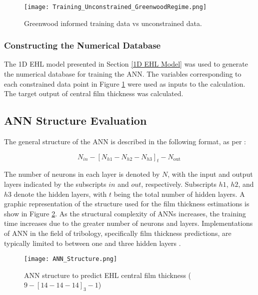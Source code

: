 \begin{figure}
	\centering  
	\texttt{[image: Training\_Unconstrained\_GreenwoodRegime.png]}
	\caption{Greenwood informed training data vs unconstrained data.}
	\label{Training_Unconstrained_GreenwoodRegime}
\end{figure} 

\subsubsection{Constructing the Numerical Database}

The 1D EHL model presented in Section \ref{1D EHL Model} was used to generate the numerical database for training the ANN. The variables corresponding to each constrained data point in Figure \ref{Training_Unconstrained_GreenwoodRegime} were used as inputs to the calculation. The target output of central film thickness was calculated.

\subsection{ANN Structure Evaluation} \label{ANN Structure Evaluation}

The general structure of the ANN is described in the following format, as per \cite{Zhang2002}:

\begin{equation}
	N_{i n}-\left[N_{h 1}-N_{h 2}-N_{h 3}\right]_t-N_{\text {out }}
\end{equation}

The number of neurons in each layer is denoted by $N$, with the input and output layers indicated by the subscripts $in$ and $out$, respectively. Subscripts $h1$, $h2$, and $h3$ denote the hidden layers, with $t$ being the total number of hidden layers. A graphic representation of the structure used for the film thickness estimations is show in Figure \ref{ANN structure}. As the structural complexity of ANNs increases, the training time increases due to the greater number of neurons and layers. Implementations of ANN in the field of tribology, specifically film thickness predictions, are typically limited to between one and three hidden layers \cite{Marian2021}.

\begin{figure}
	\centering  
	\texttt{[image: ANN\_Structure.png]}
	\caption{ANN structure to predict EHL central film thickness ($9-[14-14-14]_3-1$)}
	\label{ANN structure}
\end{figure} 

